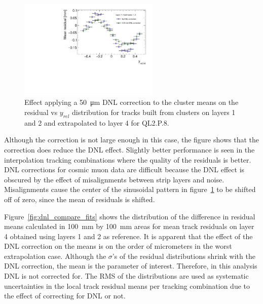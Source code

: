 \begin{figure}
    \centering
    \includegraphics[width = 0.6\textwidth]{figures/figure_dnl_profiles_blue_QL2P08_3100V_2021-06-18_no_dnl_green_QL2P08_3100V_2021-06-18_2_50um_universal_DNL_layer4_fixed12.pdf}
    \caption{Effect applying a \SI{50}{\micro\meter} DNL correction to the cluster means on the residual vs $y_{rel}$ distribution for tracks built from clusters on layers 1 and 2 and extrapolated to layer 4 for QL2.P.8.}
    \label{fig:dnl_corr_effect}
\end{figure} 

Although the correction is not large enough in this case, the figure shows that the correction does reduce the DNL effect. Slightly better performance is seen in the interpolation tracking combinations where the quality of the residuals is better. DNL corrections for cosmic muon data are difficult because the DNL effect is obscured by the effect of misalignments between strip layers and noise. Misalignments cause the center of the sinusoidal pattern in figure~\ref{fig:dnl_corr_effect} to be shifted off of zero, since the mean of residuals is shifted.

Figure~\ref{fig:dnl_compare_fits} shows the distribution of the difference in residual means calculated in \SI{100}{mm} by \SI{100}{mm} areas for mean track residuals on layer 4 obtained using layers 1 and 2 as reference. It is apparent that the effect of the DNL correction on the means is on the order of micrometers in the worst extrapolation case. Although the $\sigma$'s of the residual distributions shrink with the DNL correction, the mean is the parameter of interest. Therefore, in this analysis DNL is not corrected for. The RMS of the distributions are used as systematic uncertainties in the local track residual means per tracking combination due to the effect of correcting for DNL or not.


